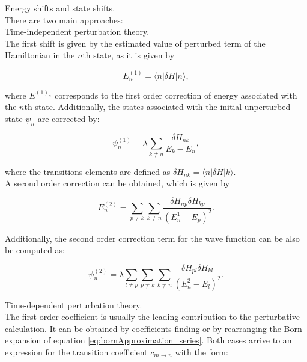\documentclass[openany]{book}
\begin{document}
Energy shifts and state shifts. \\

There are two main approaches:  \\

Time-independent perturbation theory.\\

The first shift is given by the estimated value of perturbed term of the Hamiltonian in the $n$th state, as it is given by 

\begin{equation} \label{eq:perturbationTheory_timeIndependent_E1}
	E^{(1)}_n = \langle  n |\delta H| n \rangle,
\end{equation}

where $E^{(1)_n}$ corresponds to the first order correction of energy associated with the $n$th state. Additionally, the states associated with the initial unperturbed state $\psi_n$ are corrected by:

\begin{equation} \label{eq:perturbationTheory_timeIndependent_psi1}
	\psi^{(1)}_n = \lambda \sum_{k \neq n}{\frac{\delta H_{nk}}{E_k - E_n}},
\end{equation}

where the transitions elements are defined as $\delta H_{nk} = \langle n |  \delta H | k \rangle $. \\

A second order correction can be obtained, which is given by 

\begin{equation} \label{eq:perturbationTheory_timeIndependent_E2}
	E^{(2)}_n = \sum_{p \neq k} \sum_{k \neq n} {\frac{\delta H_{np}\delta H_{kp} }{(E^{1}_n - E_p)^2}}.
\end{equation}

Additionally, the second order correction term for the wave function can be also be computed as: 

\begin{equation} \label{eq:perturbationTheory_timeIndependent_psi2}
	\psi^{(2)}_n = \lambda  \sum_{l \neq p}  \sum_{p \neq k} \sum_{k \neq n}{\frac{\delta H_{pl}\delta H_{kl} }{(E^{2}_n - E_l)^2}}.
\end{equation}


Time-dependent perturbation theory.\\

The first order coefficient is usually the leading contribution to the perturbative calculation. It can be obtained by coefficients finding or by rearranging the Born expansion of equation \ref{eq:bornApproximation_series}. Both cases arrive to an expression for the transition coefficient  $c_{m\rightarrow n} $ with the form:
\end{document}
